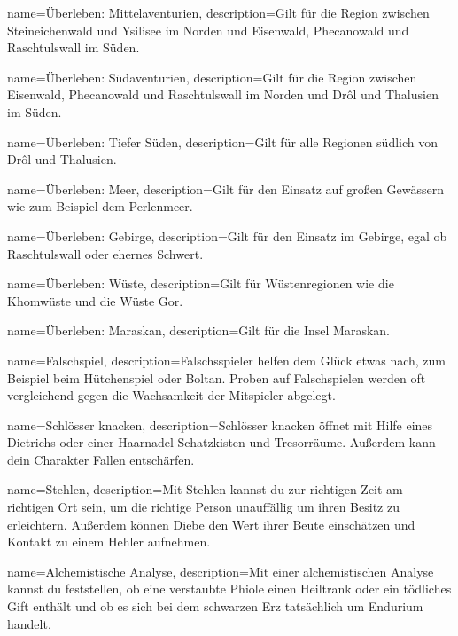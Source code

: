 {
    name={Überleben: Mittelaventurien},
    description={Gilt für die Region zwischen Steineichenwald und Ysilisee im Norden und Eisenwald, Phecanowald und Raschtulswall im Süden.}
}


{
    name={Überleben: Südaventurien},
    description={Gilt für die Region zwischen Eisenwald, Phecanowald und Raschtulswall im Norden und Drôl und Thalusien im Süden.}
}


{
    name={Überleben: Tiefer Süden},
    description={Gilt für alle Regionen südlich von Drôl und Thalusien.}
}


{
    name={Überleben: Meer},
    description={Gilt für den Einsatz auf großen Gewässern wie zum Beispiel dem Perlenmeer.}
}


{
    name={Überleben: Gebirge},
    description={Gilt für den Einsatz im Gebirge, egal ob Raschtulswall oder ehernes Schwert.}
}


{
    name={Überleben: Wüste},
    description={Gilt für Wüstenregionen wie die Khomwüste und die Wüste Gor.}
}


{
    name={Überleben: Maraskan},
    description={Gilt für die Insel Maraskan.}
}


{
    name={Falschspiel},
    description={Falschsspieler helfen dem Glück etwas nach, zum Beispiel beim Hütchenspiel oder Boltan. Proben auf Falschspielen werden oft vergleichend gegen die Wachsamkeit der Mitspieler abgelegt.}
}


{
    name={Schlösser knacken},
    description={Schlösser knacken öffnet mit Hilfe eines Dietrichs oder einer Haarnadel Schatzkisten und Tresorräume. Außerdem kann dein Charakter Fallen entschärfen.}
}


{
    name={Stehlen},
    description={Mit Stehlen kannst du zur richtigen Zeit am richtigen Ort sein, um die richtige Person unauffällig um ihren Besitz zu erleichtern. Außerdem können Diebe den Wert ihrer Beute einschätzen und Kontakt zu einem Hehler aufnehmen.}
}


{
    name={Alchemistische Analyse},
    description={Mit einer alchemistischen Analyse kannst du feststellen, ob eine verstaubte Phiole einen Heiltrank oder ein tödliches Gift enthält und ob es sich bei dem schwarzen Erz tatsächlich um Endurium handelt.}
}



